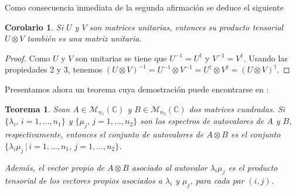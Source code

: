 \documentclass[11pt,a4paper,twoside,pdf]{article}
\numberwithin{equation}{section}
\newtheorem{theorem}{Teorema}
\newtheorem{corollary}{Corolario}
\begin{document}
		Como consecuencia inmediata de la segunda afirmación se deduce el siguiente
		
		\begin{corollary} \label{col: matrices unitarias}
			Si $U$ y $V$ son matrices unitarias, entonces su producto tensorial $U\otimes V$ también es una matriz unitaria.
		\end{corollary}
		
			\begin{proof}
					Como $U$ y $V$ son unitarias se tiene que $U^{-1}=U^\dagger$ y $V^{-1}=V^\dagger$. Usando las propiedades 2 y 3, tenemos
			$	\left( U\otimes V\right)^{-1} = U^{-1} \otimes V^{-1} = U^\dagger \otimes V^\dagger = (U\otimes V)^\dagger $.
			\end{proof}		

		
		
		Presentamos ahora un teorema cuya demostración puede encontrarse en \cite{Kronecker}: 
		
		
		\begin{theorem}	\label{th: autovalores tensor}
			Sean $A\in \mathcal{M}_{n_1}(\mathbb{C})$ y $B\in \mathcal{M}_{n_2}(\mathbb{C})$ dos matrices cuadradas. Si $\{\lambda_i, \, i=1,...,n_1\}$ y $\{\mu_j, \, j=1,...,n_2\}$ son los espectros de autovalores de $A$ y $B$, respectivamente, entonces el conjunto de autovalores de $A\otimes B$ es el conjunto $\{\lambda_i\mu_j\, | \, i=1,...,n_1, \, j=1,...,n_2 \}$.
			
			Además, el vector  propio de $A\otimes B$ asociado al autovalor $\lambda_i\mu_j$ es el producto tensorial de los vectores propios asociados a $\lambda_i$ y $\mu_j$, para cada par $(i,j)$.
		\end{theorem}
		
\end{document}
